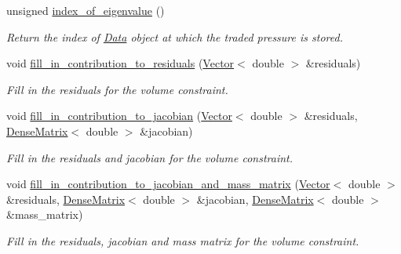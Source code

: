 \begin{DoxyCompactItemize}
unsigned \hyperlink{classoomph_1_1LinearisedNavierStokesEigenfunctionNormalisationElement_ac1eefe59911c0f64b40f31a040b1775a}{index\+\_\+of\+\_\+eigenvalue} ()
\begin{DoxyCompactList}\small\item\em Return the index of \hyperlink{classoomph_1_1Data}{Data} object at which the traded pressure is stored. \end{DoxyCompactList}\item 
void \hyperlink{classoomph_1_1LinearisedNavierStokesEigenfunctionNormalisationElement_abc4ee2562952463b2a165779d84b4db9}{fill\+\_\+in\+\_\+contribution\+\_\+to\+\_\+residuals} (\hyperlink{classoomph_1_1Vector}{Vector}$<$ double $>$ \&residuals)
\begin{DoxyCompactList}\small\item\em Fill in the residuals for the volume constraint. \end{DoxyCompactList}\item 
void \hyperlink{classoomph_1_1LinearisedNavierStokesEigenfunctionNormalisationElement_a6493569eee1886773a37e5d2641a981c}{fill\+\_\+in\+\_\+contribution\+\_\+to\+\_\+jacobian} (\hyperlink{classoomph_1_1Vector}{Vector}$<$ double $>$ \&residuals, \hyperlink{classoomph_1_1DenseMatrix}{Dense\+Matrix}$<$ double $>$ \&jacobian)
\begin{DoxyCompactList}\small\item\em Fill in the residuals and jacobian for the volume constraint. \end{DoxyCompactList}\item 
void \hyperlink{classoomph_1_1LinearisedNavierStokesEigenfunctionNormalisationElement_a2ccaac6c10a84733c6efab8890d3f048}{fill\+\_\+in\+\_\+contribution\+\_\+to\+\_\+jacobian\+\_\+and\+\_\+mass\+\_\+matrix} (\hyperlink{classoomph_1_1Vector}{Vector}$<$ double $>$ \&residuals, \hyperlink{classoomph_1_1DenseMatrix}{Dense\+Matrix}$<$ double $>$ \&jacobian, \hyperlink{classoomph_1_1DenseMatrix}{Dense\+Matrix}$<$ double $>$ \&mass\+\_\+matrix)
\begin{DoxyCompactList}\small\item\em Fill in the residuals, jacobian and mass matrix for the volume constraint. \end{DoxyCompactList}\end{DoxyCompactItemize}
